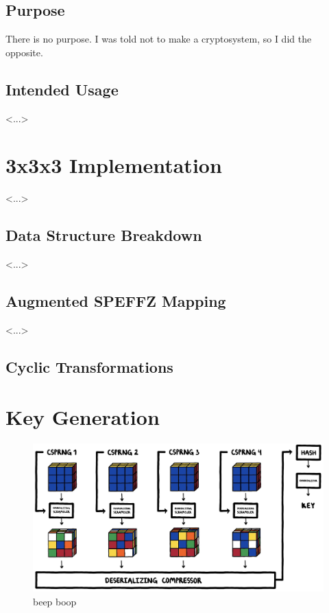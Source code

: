\documentclass[12pt]{article}
\begin{document}
\subsection{Purpose}
There is no purpose. I was told not to make a cryptosystem, so I did the opposite.

\subsection{Intended Usage}
<...>

\section{3x3x3 Implementation}
<...>

\subsection{Data Structure Breakdown}
<...>

\subsection{Augmented SPEFFZ Mapping}
<...>

\subsection{Cyclic Transformations}

\section{Key Generation}

\begin{figure}[H]
    \centering
    \includegraphics[width=\textwidth]{key_gen/keygen.jpg}
    \caption{beep boop}
\end{figure}
\end{document}
